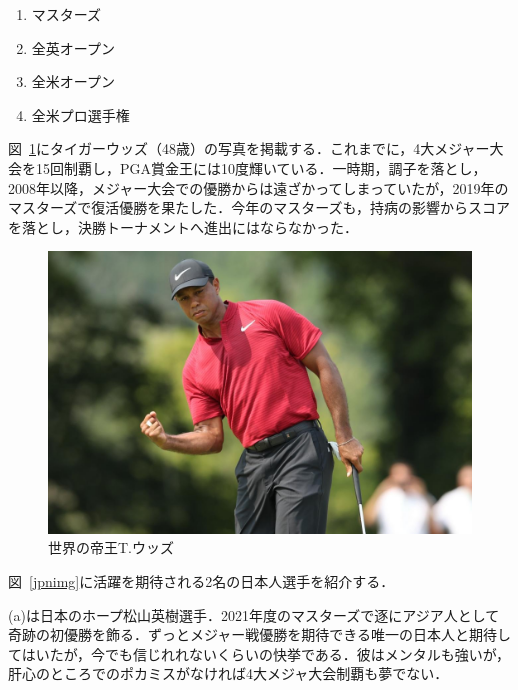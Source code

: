 \documentclass[a4j, twocolumn]{jarticle}
\begin{document}
\vspace{-15pt}

\begin{enumerate}
    \item マスターズ
    \item 全英オープン
    \item 全米オープン
    \item 全米プロ選手権
\end{enumerate}

図~\ref{tigerimg}にタイガーウッズ（48歳）の写真を掲載する．これまでに，4大メジャー大会を15回制覇し，PGA賞金王には10度輝いている．一時期，調子を落とし，2008年以降，メジャー大会での優勝からは遠ざかってしまっていたが，2019年のマスターズで復活優勝を果たした．今年のマスターズも，持病の影響からスコアを落とし，決勝トーナメントへ進出にはならなかった．\\

\begin{figure}[htb]
    \begin{center}
        \includegraphics[scale=0.07]{tiger.jpg}
        \caption{世界の帝王T.ウッズ}
        \label{tigerimg}
    \end{center}
\end{figure}

図~\ref{jpnimg}に活躍を期待される2名の日本人選手を紹介する．\\

\vspace{-15pt}

(a)は日本のホープ松山英樹選手．2021年度のマスターズで逐にアジア人として奇跡の初優勝を飾る．ずっとメジャー戦優勝を期待できる唯一の日本人と期待してはいたが，今でも信じれれないくらいの快挙である．彼はメンタルも強いが，肝心のところでのポカミスがなければ4大メジャ大会制覇も夢でない．\\
\end{document}

